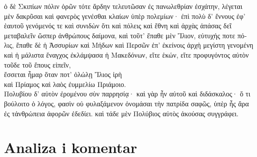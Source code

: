 {\large

\begin{greek}

\noindent  ὁ δὲ Σκιπίων πόλιν ὁρῶν τότε ἄρδην τελευτῶσαν ἐς πανωλεθρίαν ἐσχάτην, λέγεται μὲν δακρῦσαι καὶ φανερὸς γενέσθαι κλαίων ὑπὲρ πολεμίων· ἐπὶ πολὺ δ' ἔννους ἐφ' ἑαυτοῦ γενόμενός τε καὶ συνιδὼν ὅτι καὶ πόλεις καὶ ἔθνη καὶ ἀρχὰς ἁπάσας δεῖ μεταβαλεῖν ὥσπερ ἀνθρώπους δαίμονα, καὶ τοῦτ' ἔπαθε μὲν Ἴλιον, εὐτυχής ποτε πόλις, ἔπαθε δὲ ἡ Ἀσσυρίων καὶ Μήδων καὶ Περσῶν ἐπ' ἐκείνοις ἀρχὴ μεγίστη γενομένη καὶ ἡ μάλιστα ἔναγχος ἐκλάμψασα ἡ Μακεδόνων, εἴτε ἑκών, εἴτε προφυγόντος αὐτὸν τοῦδε τοῦ ἔπους εἰπεῖν,\\
\tabto{2em} ἔσσεται ἦμαρ ὅταν ποτ' ὀλώλῃ Ἴλιος ἱρὴ\\
\tabto{2em} καὶ Πρίαμος καὶ λαὸς ἐυμμελίω Πριάμοιο.\\
Πολυβίου δ' αὐτὸν ἐρομένου σὺν παρρησίᾳ· καὶ γὰρ ἦν αὐτοῦ καὶ διδάσκαλος· ὅ τι βούλοιτο ὁ λόγος, φασὶν οὐ φυλαξάμενον ὀνομάσαι τὴν πατρίδα σαφῶς, ὑπὲρ ἧς ἄρα ἐς τἀνθρώπεια ἀφορῶν ἐδεδίει. καὶ τάδε μὲν Πολύβιος αὐτὸς ἀκούσας συγγράφει.

\end{greek}

}


\section*{Analiza i komentar}



